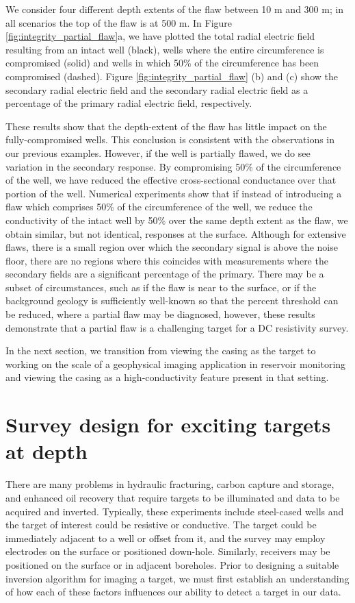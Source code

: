 \documentclass[extra,mreferee]{gji}
\begin{document}
We consider four different depth extents of the flaw between 10 m and 300 m; in all scenarios the top of the flaw is at 500 m. In Figure \ref{fig:integrity_partial_flaw}a, we have plotted the total radial electric field resulting from an intact well (black), wells where the entire circumference is compromised (solid) and wells in which 50\% of the circumference has been compromised (dashed).  Figure \ref{fig:integrity_partial_flaw} (b) and (c) show the secondary radial electric field and the secondary radial electric field as a percentage of the primary radial electric field, respectively.

These results show that the depth-extent of the flaw has little impact on the fully-compromised wells. This conclusion is consistent with the observations in our previous examples. However, if the well is partially flawed, we do see variation in the secondary response. By compromising 50\% of the circumference of the well, we have reduced the effective cross-sectional conductance over that portion of the well. Numerical experiments show that if instead of introducing a flaw which comprises 50\% of the circumference of the well, we reduce the conductivity of the intact well by 50\% over the same depth extent as the flaw, we obtain similar, but not identical, responses at the surface. Although for extensive flaws, there is a small region over which the secondary signal is above the noise floor, there are no regions where this coincides with measurements where the secondary fields are a significant percentage of the primary. There may be a subset of circumstances, such as if the flaw is near to the surface, or if the background geology is sufficiently well-known so that the percent threshold can be reduced, where a partial flaw may be diagnosed, however, these results demonstrate that a partial flaw is a challenging target for a DC resistivity survey.






In the next section, we transition from viewing the casing as the target to working on the scale of a geophysical imaging application in reservoir monitoring and viewing the casing as a high-conductivity feature present in that setting.

\section{Survey design for exciting targets at depth}
\label{sec:survey_design}
There are many problems in hydraulic fracturing, carbon capture and storage, and enhanced oil recovery that require targets to be illuminated and data to be acquired and inverted. Typically, these experiments include steel-cased wells and the target of interest could be resistive or conductive. The target could be immediately adjacent to a well or offset from it, and the survey may employ electrodes on the surface or positioned down-hole. Similarly, receivers may be positioned on the surface or in adjacent boreholes. Prior to designing a suitable inversion algorithm for imaging a target, we must first establish an understanding of how each of these factors influences our ability to detect a target in our data.
\end{document}
